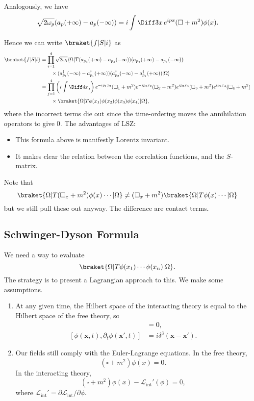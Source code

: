 \documentclass[12pt]{article}
\begin{document}
Analogously, we have
\[
	\sqrt{2 \omega_p} (a_p(+\infty) - a_p(-\infty)) = i \int \Diff 3 x \, e^{ipx} (\square + m^2)\phi(x).
\]

Hence we can write $\braket{f|S|i}$ as
\begin{align*}
	\braket{f|S|i} &= \prod_{i= 1}^4 \sqrt{2 \omega_i} \langle\Omega | T(a_{p_3}(+\infty) - a_{p_3}(-\infty))(a_{p_4}(+\infty)- a_{p_4}(-\infty))\\
		       & \qquad \times (a_{p_1}^{\dagger}(-\infty)- a_{p_1}^{\dagger}(+\infty))(a_{p_2}^{\dagger}(-\infty) - a_{p_2}^{\dagger}(+\infty))| \Omega\rangle \\
		       &= \prod_{j = 1}^{4} \left( i \int \Diff 4 x_j \right) e^{-ip_1 x_2}(\square_1 + m^2) e^{-ip_2x_2} (\square_2 + m^2) e^{ip_3x_3} (\square_3 + m^2) e^{ip_4x_4}(\square_4+m^2) \\
		       & \qquad \times \braket{\Omega | T \phi(x_1) \phi(x_2) \phi(x_3) \phi(x_4)| \Omega},
\end{align*}
where the incorrect terms die out since the time-ordering moves the annihilation operators to give 0. The advantages of LSZ:
\begin{itemize}
	\item This formula above is manifestly Lorentz invariant.
	\item It makes clear the relation between the correlation functions, and the $S$-matrix.
\end{itemize}

Note that
\[
	\braket{\Omega | T (\square_x + m^2) \phi(x) \cdots | \Omega} \neq (\square_x + m^2) \braket{\Omega | T \phi(x) \cdots | \Omega}
\]
but we still pull these out anyway. The difference are contact terms.


\subsection{Schwinger-Dyson Formula}%
\label{sub:sdf}

We need a way to evaluate
\[
	\braket{\Omega | T \phi(x_1) \cdots \phi(x_n) | \Omega}.
\]
The strategy is to present a Lagrangian approach to this. We make some assumptions.
\begin{enumerate}
	\item At any given time, the Hilbert space of the interacting theory is equal to the Hilbert space of the free theory, so
		\begin{align*}
			[\phi(\mathbf{x}, t), \phi(\mathbf{x}', t)] &= 0, \\
			[\phi(\mathbf{x}, t), \partial_t \phi(\mathbf{x}', t)] &= i \delta^3(\mathbf{x} - \mathbf{x}').
		\end{align*}
	\item Our fields still comply with the Euler-Lagrange equations. In the free theory,
		\[
			(\square + m^2) \phi(x) = 0.
		\]
		In the interacting theory,
		\[
			(\square + m^2) \phi(x) - \mathcal{L}_{\mathrm{int}}'(\phi) = 0,
		\]
		where $\mathcal{L}_{\mathrm{int}}' = \partial \mathcal{L}_{\mathrm{int}} / \partial \phi$.
\end{enumerate}
\end{document}
